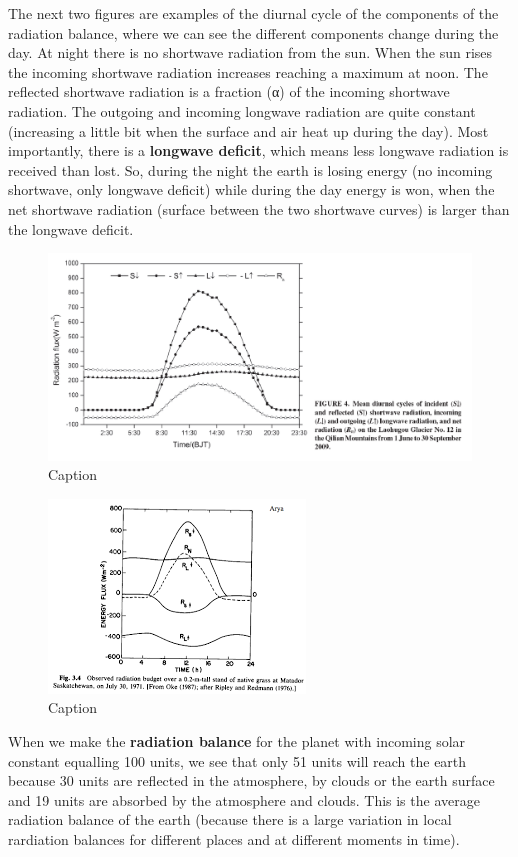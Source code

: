 \documentclass[oneside]{book}
\begin{document}
The next two figures are examples of the diurnal cycle of the components
of the radiation balance, where we can see the different components
change during the day. At night there is no shortwave radiation from the
sun. When the sun rises the incoming shortwave radiation increases
reaching a maximum at noon. The reflected shortwave radiation is a
fraction (α) of the incoming shortwave radiation. The outgoing and
incoming longwave radiation are quite constant (increasing a little bit
when the surface and air heat up during the day). Most importantly,
there is a \textbf{longwave deficit}, which means less longwave
radiation is received than lost. So, during the night the earth is
losing energy (no incoming shortwave, only longwave deficit) while
during the day energy is won, when the net shortwave radiation (surface
between the two shortwave curves) is larger than the longwave deficit.

\begin{figure}

{\centering \includegraphics[width=0.5\linewidth]{figures/Figure136} 

}

\caption{Caption}\label{fig:RadiationCycle}
\end{figure}

\begin{figure}

{\centering \includegraphics[width=0.5\linewidth]{figures/Figure137} 

}

\caption{Caption}\label{fig:RadiationCycle2}
\end{figure}

When we make the \textbf{radiation balance} for the planet with incoming
solar constant equalling 100 units, we see that only 51 units will reach
the earth because 30 units are reflected in the atmosphere, by clouds or
the earth surface and 19 units are absorbed by the atmosphere and
clouds. This is the average radiation balance of the earth (because
there is a large variation in local rardiation balances for different
places and at different moments in time).
\end{document}
